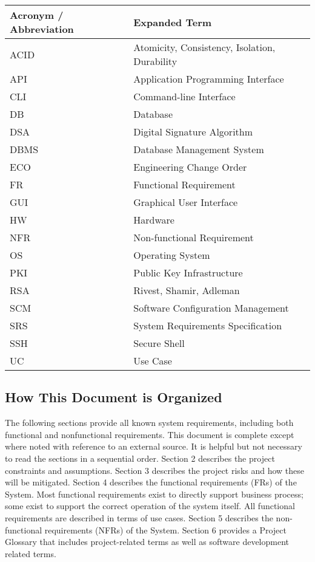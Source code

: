 \documentclass[12pt]{article}
\begin{document}
\begin{table}[!h]
	\begin{tabular}{| l | l |}
		\hline
		\textbf{Acronym / Abbreviation}		& \textbf{Expanded Term}\\
		\hline
		ACID	& Atomicity, Consistency, Isolation, Durability\\
		\hline
		API		& Application Programming Interface\\
		\hline
		CLI		& Command-line Interface\\
		\hline
		DB		& Database\\
		\hline
		DSA		& Digital Signature Algorithm\\
		\hline
		DBMS	& Database Management System\\
		\hline
		ECO		&	Engineering Change Order\\
		\hline
		FR		&	Functional Requirement\\
		\hline
		GUI		& Graphical User Interface\\
		\hline
		HW		& Hardware\\
		\hline
		NFR		&	Non-functional Requirement\\
		\hline
		OS		& Operating System\\
		\hline
		PKI		& Public Key Infrastructure\\
		\hline
		RSA		& Rivest, Shamir, Adleman\\
		\hline
		SCM		& Software Configuration Management\\
		\hline
		SRS		& System Requirements Specification\\
		\hline
		SSH		& Secure Shell\\
		\hline
		UC		&	Use Case\\
		\hline
	\end{tabular}
	\label{tab:AcronymsAndAbbreviations}
\end{table}

\subsection{How This Document is Organized}

The following sections provide all known system requirements, including both functional and nonfunctional requirements. 
This document is complete except where noted with reference to an external source. It is helpful but not necessary to read 
the sections in a sequential order. Section 2 describes the project constraints and assumptions. Section 3 describes the 
project risks and how these will be mitigated. Section 4 describes the functional requirements (FRs) of the System. Most 
functional requirements exist to directly support business process; some exist to support the correct operation of the system 
itself. All functional requirements are described in terms of use cases. Section 5 describes the non-functional requirements 
(NFRs) of the System. Section 6 provides a Project Glossary that includes project-related terms as well as software 
development related terms.
\end{document}
